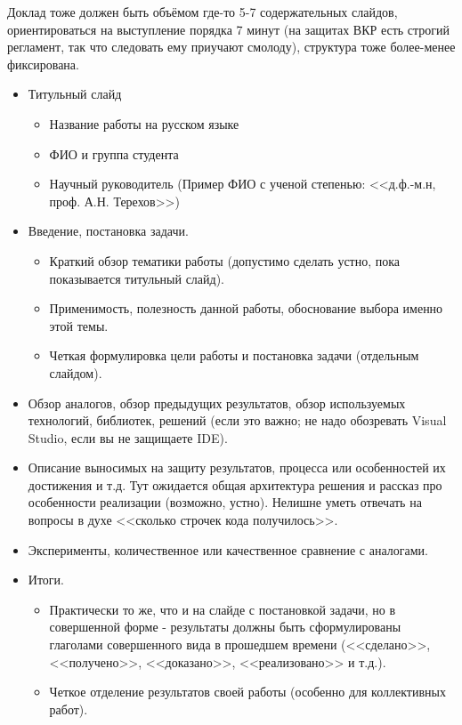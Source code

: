\documentclass[a5paper]{article}
\begin{document}
Доклад тоже должен быть объёмом где-то 5-7 содержательных слайдов, ориентироваться на выступление порядка 7 минут (на защитах ВКР есть строгий регламент, так что следовать ему приучают смолоду), структура тоже более-менее фиксирована.
\begin{itemize}
	\item Титульный слайд
	\begin{itemize}
		\item Название работы на русском языке
		\item ФИО и группа студента
		\item Научный руководитель (Пример ФИО с ученой степенью: <<д.ф.-м.н, проф. А.Н. Терехов>>)
	\end{itemize}
	\item Введение, постановка задачи.
	\begin{itemize}
		\item Краткий обзор тематики работы (допустимо сделать устно, пока показывается титульный слайд).
		\item Применимость, полезность данной работы, обоснование выбора именно этой темы.
		\item Четкая формулировка цели работы и постановка задачи (отдельным слайдом).
	\end{itemize}
	\item Обзор аналогов, обзор предыдущих результатов, обзор используемых технологий, библиотек, решений (если это важно; не надо обозревать Visual Studio, если вы не защищаете IDE).
	\item Описание выносимых на защиту результатов, процесса или особенностей их достижения и т.д. Тут ожидается общая архитектура решения и рассказ про особенности реализации (возможно, устно). Нелишне уметь отвечать на вопросы в духе <<сколько строчек кода получилось>>.
	\item Эксперименты, количественное или качественное сравнение с аналогами.
	\item Итоги.
	\begin{itemize}
		\item Практически то же, что и на слайде с постановкой задачи, но в совершенной форме - результаты должны быть сформулированы глаголами совершенного вида в прошедшем времени (<<сделано>>, <<получено>>, <<доказано>>, <<реализовано>> и т.д.).
		\item Четкое отделение результатов своей работы (особенно для коллективных работ).
	\end{itemize}
\end{itemize}
\end{document}
